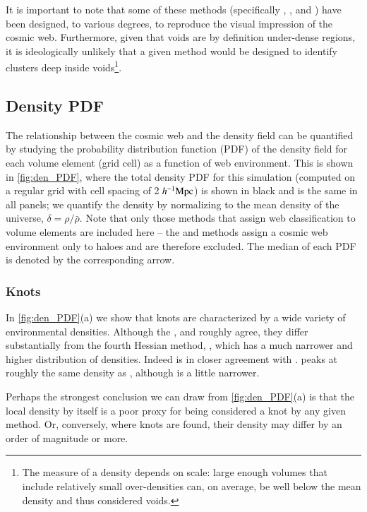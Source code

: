 It is important to note that some of these methods (specifically \nexus{}, \mmft{}, \tweb{} and \vweb{}) have been designed, to various degrees, to reproduce the visual impression of the cosmic web. Furthermore, given that voids are by definition under-dense regions, it is ideologically unlikely that a given method would be designed to identify clusters deep inside voids\footnote{The measure of a density depends on scale: large enough volumes that include relatively small over-densities can, on average, be well below the mean density and thus considered voids.}.

\subsection{Density PDF}
The relationship between the cosmic web and the density field can be quantified by studying the probability distribution function (PDF) of the density field for each volume element (grid cell) as a function of web environment. This is shown in \autoref{fig:den_PDF}, where the total density PDF for this simulation (computed on a regular grid with cell spacing of 2$~h^{-1}\rm Mpc$) is shown in black and is the same in all panels; we quantify the density by normalizing to the mean density of the universe, $\delta=\rho/\bar{\rho}$. Note that only those methods that assign web classification to volume elements are included here -- the \fine{} and \mst{} methods assign a cosmic web environment only to haloes and are therefore excluded. The median of each PDF is denoted by the corresponding arrow.

\subsubsection{Knots} 
In \autoref{fig:den_PDF}(a) we show that knots are characterized by a wide variety of environmental densities. Although the \tweb{}, \vweb{} and \classic{} roughly agree, they differ substantially from the fourth Hessian method, \nexus{}, which has a much narrower and higher distribution of densities. Indeed \nexus{} is in closer agreement with \mswa{}. \origami{} peaks at roughly the same density as \vweb{}, although is a little narrower.

Perhaps the strongest conclusion we can draw from \autoref{fig:den_PDF}(a) is that the local density by itself is a poor proxy for being considered a knot by any given method. Or, conversely, where knots are found, their density may differ by an order of magnitude or more.

